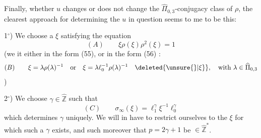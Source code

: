 Finally, whether $u$ changes or does not change the $\widehat{\Pi}_{0,3}$-conjugacy class of $\rho$, the clearest approach for determining the $u$ in question seems to me to be this:

1$^\circ$) We choose a $\xi$  satisfying the equation
\[
(A)\qquad \xi\rho(\xi)\rho^2(\xi)=1
\]
(we  it either in the form (55), or in the form (56)\deleted{\unsure{)}} :
\[
(B)\qquad
\xi=\lambda\rho(\lambda)^{-1}
\quad\text{or}\quad
\xi=\lambda\ell_0^{-1}\rho(\lambda)^{-1}
\quad\deleted{\unsure{\rbrace|\xi}},\quad\text{with }\lambda\in\widehat{\Pi}_{0,3}
\]
)

2$^\circ$) We choose $\gamma\in\widehat{\mathbb Z}$ such that
\[
(C)\qquad \sigma_\infty(\xi)=\ell_1^\gamma\xi^{-1}\ell_0^\gamma
\]
which determines $\gamma$ uniquely. We will in  have to restrict ourselves to the $\xi$  for which such a $\gamma$ exists, and such moreover that $p=2\gamma+1$ be $\in\widehat{\mathbb Z}^{*}$.
